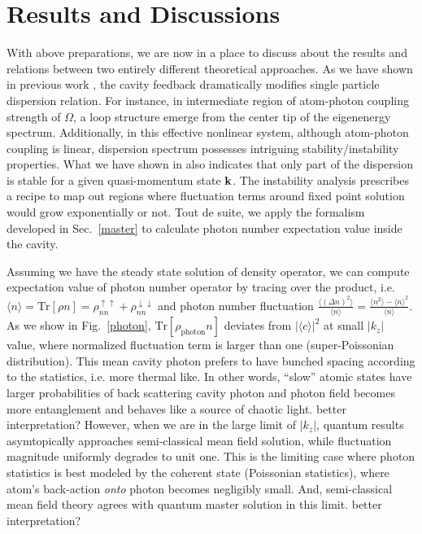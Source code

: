 \documentclass[journal,article,accept,moreauthors,pdftex,12pt,a4paper]{mdpi}
\begin{document}
\section{Results and Discussions} \label{relation}

With above preparations, we are now in a place to discuss about the results and relations between two entirely different theoretical approaches. As we have shown in previous work \cite{cavitySOC}, the cavity feedback dramatically modifies single particle dispersion relation. For instance, in intermediate region of atom-photon coupling strength of $\Omega$, a loop structure emerge from the center tip of the eigenenergy spectrum. Additionally, in this effective nonlinear system, although atom-photon coupling is linear, dispersion spectrum possesses intriguing stability/instability properties. What we have shown in \cite{cavitySOC} also indicates that only part of the dispersion is stable for a given quasi-momentum state ${\bf k}$. The instability analysis prescribes a recipe to map out regions where fluctuation terms around fixed point solution would grow exponentially or not. Tout de suite, we apply the formalism developed in Sec.~\ref{master} to calculate photon number expectation value inside the cavity.

Assuming we have the steady state solution of density operator, we can compute expectation value of photon number operator by tracing over the product, i.e. $\langle n\rangle=\text{Tr}[\rho n]=\rho_{nn}^{\uparrow\uparrow}+\rho_{nn}^{\downarrow\downarrow}$ and  photon number fluctuation $\frac{\langle(\Delta n)^{2}\rangle}{\langle n\rangle}=\frac{\langle n^{2}\rangle-\langle n\rangle^{2}}{\langle n\rangle}$. As we show in Fig.~\ref{photon}, $\text{Tr}[\rho_\text{photon}n]$ deviates from $|\langle c\rangle|^2$ at small $|k_z|$ value, where normalized fluctuation term is larger than one (super-Poissonian distribution). This mean cavity photon prefers to have bunched spacing according to the statistics, i.e. more thermal like. In other words, ``slow'' atomic states have larger probabilities of back scattering cavity photon and photon field becomes more entanglement and behaves like a source of chaotic light. {\color{red} better interpretation?} However, when we are in the large limit of  $|k_z|$, quantum results asymtopically approaches semi-classical mean field solution, while fluctuation magnitude uniformly degrades to unit one. This is the limiting case where photon statistics is best modeled by the coherent state (Poissonian statistics), where atom's back-action {\em onto} photon becomes negligibly small. And, semi-classical mean field theory agrees with quantum master solution in this limit. {\color{red} better interpretation?}
\end{document}
